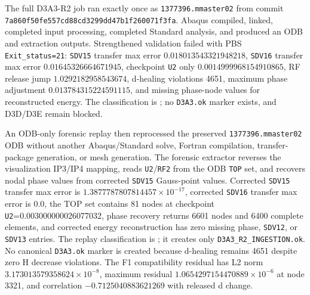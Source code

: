 \documentclass[11pt,a4paper]{article}
\begin{document}
The full D3A3-R2 job ran exactly once as \texttt{1377396.mmaster02} from commit
\texttt{7a860f50fe557cd88cd3299dd47b1f260071f3fa}. Abaqus compiled, linked,
completed input processing, completed Standard analysis, and produced an ODB
and extraction outputs. Strengthened validation failed with PBS
\texttt{Exit\_status=21}: \texttt{SDV15} transfer max error
$0.018013543321948218$, \texttt{SDV16} transfer max error
$0.01645326664671945$, checkpoint \texttt{U2} only
$0.0014999968154910865$, RF release jump $1.0292182958543674$, d-healing
violations 4651, maximum phase adjustment $0.013784315224591115$, and missing
phase-node values for reconstructed energy. The classification is
; no \texttt{D3A3.ok} marker exists,
and D3D/D3E remain blocked.

An ODB-only forensic replay then reprocessed the preserved
\texttt{1377396.mmaster02} ODB without another Abaqus/Standard solve,
Fortran compilation, transfer-package generation, or mesh generation. The
forensic extractor reverses the visualization IP3/IP4 mapping, reads
\texttt{U2}/\texttt{RF2} from the ODB \texttt{TOP} set, and recovers nodal
phase values from corrected \texttt{SDV15} Gauss-point values. Corrected
\texttt{SDV15} transfer max error is $1.3877787807814457\times10^{-17}$,
corrected \texttt{SDV16} transfer max error is $0.0$, the TOP set contains 81
nodes at checkpoint \texttt{U2}=0.003000000026077032, phase recovery returns
6601 nodes and 6400 complete elements, and corrected energy reconstruction has
zero missing phase, \texttt{SDV12}, or \texttt{SDV13} entries. The replay
classification is
; it creates only
\texttt{D3A3\_R2\_INGESTION.ok}. No canonical \texttt{D3A3.ok} marker is
created because d-healing remains 4651 despite zero H decrease violations.
The F1 compatibility residual has L2 norm $3.173013579358624\times10^{-8}$,
maximum residual $1.0654297154470889\times10^{-6}$ at node 3321, and
correlation $-0.7125040883621269$ with released d change.
\end{document}
